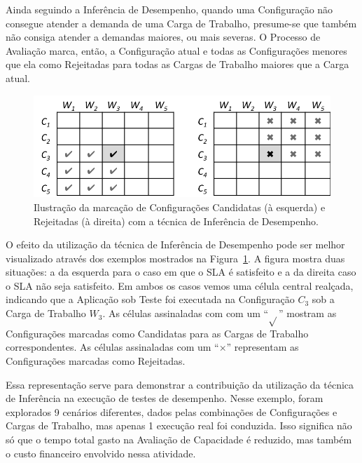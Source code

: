 Ainda seguindo a Inferência de Desempenho, quando uma Configuração não consegue
atender a demanda de uma Carga de Trabalho, presume-se que também não consiga
atender a demandas maiores, ou mais severas. O Processo de Avaliação marca, então,
a Configuração atual e todas as Configurações menores que ela como Rejeitadas para todas as Cargas de Trabalho maiores que a Carga atual. 

\begin{figure}[t]
  \begin{center}
    \includegraphics[scale=.8]{img/inference}
  \end{center}
  \caption{\label{fig:fig_processo_inferencia}Ilustração da marcação de Configurações Candidatas (à esquerda) e Rejeitadas (à direita) com a técnica de Inferência de Desempenho.}
\end{figure}

O efeito da utilização da técnica de Inferência de Desempenho pode ser melhor
visualizado através dos exemplos mostrados na Figura~\ref{fig:fig_processo_inferencia}. A figura mostra 
duas situações: a da esquerda para o caso em que o SLA é satisfeito e a da direita 
caso o SLA não seja satisfeito. Em ambos os casos vemos uma célula central realçada, 
indicando que a Aplicação sob Teste foi executada na Configuração $C_3$ sob a 
Carga de Trabalho $W_3$. As células assinaladas com com um ``\boldmath$\surd{}$'' mostram as Configurações
marcadas como Candidatas para as Cargas de Trabalho correspondentes. As células
assinaladas com um ``\boldmath$\times{}$'' representam as Configurações marcadas como Rejeitadas.

Essa representação serve para demonstrar a contribuição da utilização da técnica 
de Inferência na execução de testes de desempenho. Nesse exemplo, foram 
explorados 9 cenários diferentes, dados pelas combinações de Configurações e 
Cargas de Trabalho, mas apenas 1 execução real foi conduzida. Isso significa não
só que o tempo total gasto na Avaliação de Capacidade é reduzido, mas também o
custo financeiro envolvido nessa atividade. 

